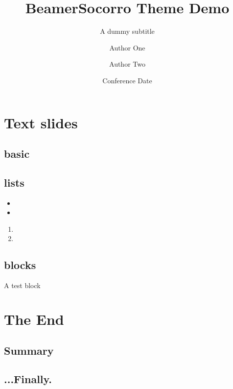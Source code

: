 \documentclass[11pt]{beamer}
\title[Short Title]{BeamerSocorro Theme Demo}
\subtitle{A dummy subtitle}
\author[1,*]{Author One}
\author[2,**]{Author Two}
\affil[1]{Place One}
\affil[2]{Place Two}
\date{Conference Date}
\begin{document}
\titleslide
{}


\section{Text slides}
\subsection{basic}
\begin{frame}{\secname}
    \lipsum[1][1-6]   
    \lipsum[1][1] 
\end{frame}

\subsection{lists}
\begin{frame}{\secname}
    \begin{itemize}
        \item \lipsum[1][1]   
        \item \lipsum[1][2]
    \end{itemize}
    \begin{enumerate}
        \item \lipsum[1][1]   
        \item \lipsum[1][2]
    \end{enumerate}
\end{frame}

\subsection{blocks}
\begin{frame}{\secname}
    \begin{block}{A test block}
        \lipsum[1][1] 
    \end{block}
\end{frame}

\section{The End}
\subsection{Summary}
\begin{frame}{\secname}

\end{frame}
\subsection*{...Finally.}
\end{document}
